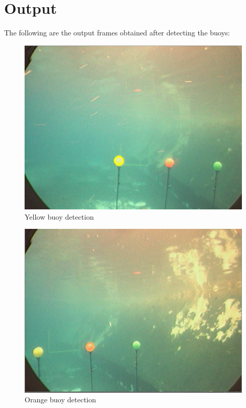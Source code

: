 \documentclass[12pt]{article}
\begin{document}
\section{Output}
The following are the output frames obtained after detecting the buoys:
\begin{figure}[h]
    \centering
    \includegraphics[width=16cm]{yellowbuoydetection}
    \caption{Yellow buoy detection}
    \label{fig:Yellow buoy detection}
\end{figure}
\newpage
\begin{figure}[h]
    \centering
    \includegraphics[width=16cm]{orangebuoydetection}
    \caption{Orange buoy detection}
    \label{fig:Orange buoy detection}
\end{figure}
\end{document}
